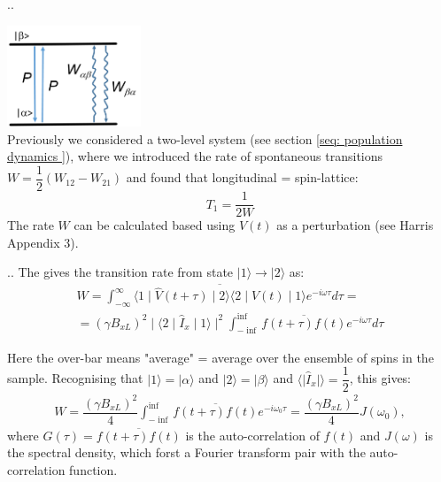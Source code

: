 \documentclass{beamer}
\begin{document}
\begin{frame}{\thesection.\thesubsection. \insertsubsection}

	\includegraphics[width=0.3\textwidth]{figures/two_level_population.png} \\
	 Previously we considered a two-level system  (see section \ref{seq: population dynamics }), where we introduced the rate of spontaneous transitions $W = \dfrac{1}{2}(W_{12} -W_{21})$ and found that \alert{longitudinal = spin-lattice}:
	 \begin{equation}
	   T_1 = \dfrac{1}{2 W}
	 \end{equation}
	 The rate $W$ can be calculated based using $V(t)$ as a perturbation (see Harris Appendix 3).
	
\end{frame}

\begin{frame}{\thesection.\thesubsection. \insertsubsection}	
	\onslide<1>
    The gives the transition rate from state $\mid 1 \rangle \rightarrow \mid 2 \rangle$ as:  
    \begin{multline}
       W = \int_{- \infty}^{\infty} \overline{ \langle 1 \mid \hat{V}(t+ \tau) \mid 2  \rangle \langle 2 \mid  \hat{V}(t)  \mid 1 \rangle  } e^{-i \omega \tau} d\tau = \\
       = (\gamma B_{xL})^2 \mid \langle 2 \mid \hat{I}_x \mid 1 \rangle \mid^2 \int_{ -\inf}^{\inf} \overline{ f(t+\tau) f(t) } e^{-i \omega \tau} d\tau
    \end{multline}
   
    Here the over-bar means "average" = average over the ensemble of spins in the sample.   Recognising that $ \vert 1 \rangle = \vert \alpha \rangle $ and $ \vert 2 \rangle = \vert \beta \rangle $ and $ \langle  \mid  \hat{I}_x \mid \rangle  = \dfrac{1}{2} $, this gives:
    \begin{multline}
       W = \dfrac{(\gamma B_{xL})^2}{4} \int_{- \inf}^{\inf} \overline{f(t+\tau) f(t)} e^{-i \omega_0 \tau} = \dfrac{(\gamma B_{xL})^2}{4} J(\omega_0),
    \end{multline}
    where $G(\tau) = \overline{f(t+ \tau) f(t)}$ is the \alert{auto-correlation} of $f(t)$ and $J(\omega)$ is the \alert{spectral density}, which forst a Fourier transform pair with the auto-correlation function.
\end{frame}
\end{document}

